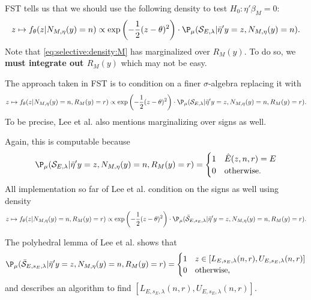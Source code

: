 \documentclass{article}
\begin{document}
          FST tells us that we should use the following density to test
          $H_0:\eta'\beta_M=0$:
        \begin{equation}
          \label{eq:selective:density:M}
        z \mapsto f_{\theta}(z | N_{M,\eta}(y)=n) \propto \exp
        \left(-\frac{1}{2}(z-\theta)^2 \right) \cdot \P_{\mu}({\cal
          S}_{E,\lambda} | \bar{\eta}'y=z, N_{M,\eta}(y)=n).
        \end{equation}
        Note that \eqref{eq:selective:density:M}  has marginalized
        over $R_M(y)$. To do so, we {\bf must integrate out $R_M(y)$}
        which may not be easy.

        The approach taken in FST is to condition on a finer
        $\sigma$-algebra replacing it with
        \begin{equation}
          \label{eq:selective:density:FST}
        z \mapsto f_{\theta}(z | N_{M,\eta}(y)=n, R_M(y)=r) \propto
        \exp \left(-\frac{1}{2}(z-\theta)^2 \right) \cdot
        \P_{\mu}({\cal S}_{E,\lambda} | \bar{\eta}'y=z, N_{M,\eta}(y)=n,
        R_M(y)=r).
        \end{equation}
        To be precise, Lee et al. also mentions marginalizing over
        signs as well.
        
        Again, this is computable because
        $$ \P_{\mu}({\cal S}_{E,\lambda} | \bar{\eta}'y=z, N_{M,\eta}(y)=n,
        R_M(y)=r) =
        \begin{cases}
          1 & \hat{E}(z,n,r)=E \\ 0 & \text{otherwise.}
          \end{cases}
        $$
        All implementation so far of Lee et al. condition on the signs as well using density
        \begin{equation}
          \label{eq:selective:density:FST}
        z \mapsto f_{\theta}(z | N_{M,\eta}(y)=n, R_M(y)=r) \propto
        \exp \left(-\frac{1}{2}(z-\theta)^2 \right) \cdot
        \P_{\mu}(\bar{\cal S}_{E,s_E,\lambda} | \bar{\eta}'y=z,
        N_{M,\eta}(y)=n, R_M(y)=r).
        \end{equation}

        The polyhedral lemma of Lee et al. shows that
        $$ \P_{\mu}(\bar{\cal S}_{E,s_E,\lambda} | \bar{\eta}'y=z,
        N_{M,\eta}(y)=n, R_M(y)=r) =
        \begin{cases}
          1 & z \in [L_{E,s_E,\lambda}(n,r), U_{E,s_E,\lambda}(n,r)] \\ 0 &
          \text{otherwise,}
          \end{cases}
        $$ and describes an algorithm to find $[L_{E,s_E,\lambda}(n,r),
          U_{E,s_E,\lambda}(n,r)] $.
\end{document}
